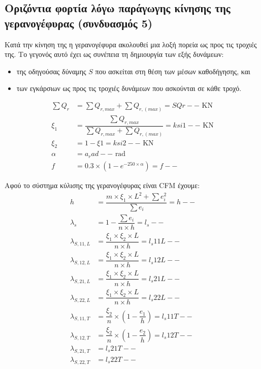 
\subsection{Οριζόντια φορτία λόγω παράγωγης κίνησης της γερανογέφυρας (συνδυασμός 5)}
Κατά την κίνηση της η γερανογέφυρα ακολουθεί μια λοξή πορεία ως προς τις τροχιές της. Το γεγονός αυτό έχει ως συνέπεια τη δημιουργία των εξής δυνάμεων:
\begin{itemize} 
\item της οδηγούσας δύναμης $S$ που ασκείται στη θέση των μέσων καθοδήγησης, και
\item των εγκάρσιων ως προς τις τροχιές δυνάμεων που ασκούνται σε κάθε τροχό.
\end{itemize}

\begin{align*}\sum{Q_r} &= \displaystyle\sum{Q_{r,max}} + \displaystyle\sum{Q_{r,(max)}} = SQr-- \text{ KN} \\ 
\xi_1    &= \dfrac{\displaystyle\sum{Q_{r,max}}}{\displaystyle\sum{Q_{r,max}} + \displaystyle\sum{Q_{r,(max)}}} = ksi1-- \text{ KN} \\ 
\xi_2    &= 1 - \xi1 = ksi2-- \text{ KN} \\ 
\alpha    &= a_rad-- \text{ rad} \\ 
f         &= 0.3 \times \left(1 - e^{-250 \times \alpha}\right) = f--
\end{align*}

Αφού το σύστημα κύλισης της γερανογέφυρας είναι CFM έχουμε:
\begin{align*}
h                &= \dfrac{m \times \xi_1 \times L^2 + \sum{e_i^2}}{\sum{e_i}} = h-- \\ 
\lambda_s        &= 1 - \dfrac{\sum{e_i}}{n \times h} =  l_s-- \\ 
\lambda_{S,11,L} &= \dfrac{\xi_1 \times \xi_2 \times L}{n \times h}= l_s11L-- \\ 
\lambda_{S,12,L} &= \dfrac{\xi_1 \times \xi_2 \times L}{n \times h}= l_s12L-- \\ 
\lambda_{S,21,L} &= \dfrac{\xi_1 \times \xi_2 \times L}{n \times h}= l_s21L-- \\ 
\lambda_{S,22,L} &= \dfrac{\xi_1 \times \xi_2 \times L}{n \times h}= l_s22L-- \\ 
\lambda_{S,11,T} &= \dfrac{\xi_2}{n} \times \left(1 - \dfrac{e_1}{h}\right) = l_s11T-- \\ 
\lambda_{S,12,T} &= \dfrac{\xi_2}{n} \times \left(1 - \dfrac{e_2}{h}\right) = l_s12T-- \\ 
\lambda_{S,21,T} &= l_s21T-- \\ 
\lambda_{S,22,T} &= l_s22T--
\end{align*}

